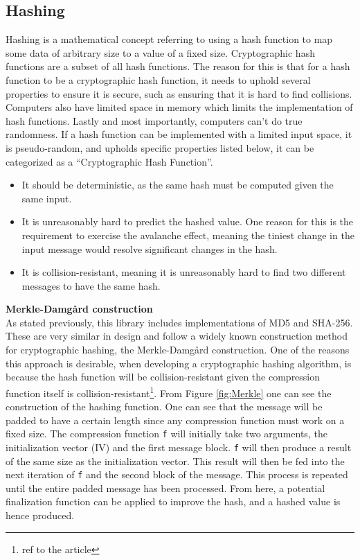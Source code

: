 \documentclass[a4paper, openany]{book}
\begin{document}
\subsection{Hashing}
\label{sec:org0bf8e42}
Hashing is a mathematical concept referring to using a hash function to map some data of arbitrary size to a value of a fixed size. Cryptographic hash functions are a subset of all hash functions.
The reason for this is that for a hash function to be a cryptographic hash function, it needs to uphold several properties to ensure it is secure, such as ensuring that it is hard to find collisions. Computers also have limited space in memory which limits the implementation of hash functions. Lastly and most importantly, computers can't do true randomness.
If a hash function can be implemented with a limited input space, it is pseudo-random, and upholds specific properties listed below, it can be categorized as a ``Cryptographic Hash Function''.
\begin{itemize}
\item It should be deterministic, as the same hash must be computed given the same input.
\item It is unreasonably hard to predict the hashed value. One reason for this is the requirement to exercise the avalanche effect, meaning the tiniest change in the input message would resolve significant changes in the hash.
\item It is collision-resistant, meaning it is unreasonably hard to find two different messages to have the same hash.
\end{itemize}

\textbf{Merkle-Damgård construction}\\
As stated previously, this library includes implementations of MD5 and SHA-256. These are very similar in design and follow a widely known construction method for cryptographic hashing, the Merkle-Damgård construction. One of the reasons this approach is desirable, when developing a cryptographic hashing algorithm, is because the hash function will be collision-resistant given the compression function itself is collision-resistant\footnote{ref to the article}.
From Figure \ref{fig:Merkle} one can see the construction of the hashing function. One can see that the message will be padded to have a certain length since any compression function must work on a fixed size. The compression function \texttt{f} will initially take two arguments, the initialization vector (IV) and the first message block. \texttt{f} will then produce a result of the same size as the initialization vector. This result will then be fed into the next iteration of \texttt{f} and the second block of the message. This process is repeated until the entire padded message has been processed. From here, a potential finalization function can be applied to improve the hash, and a hashed value is hence produced.
\end{document}
